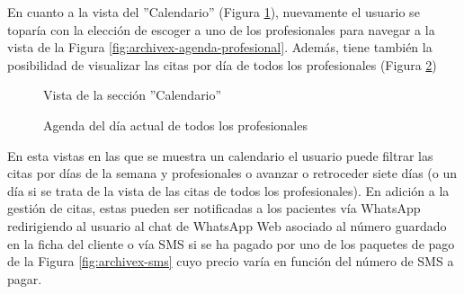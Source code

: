 En cuanto a la vista del ''Calendario'' (Figura \ref{fig:archivex-calendario}), nuevamente el usuario se toparía con la elección de escoger a uno de los profesionales para navegar a la vista de la Figura \ref{fig:archivex-agenda-profesional}. Además, tiene también la posibilidad de visualizar las citas por día de todos los profesionales (Figura \ref{fig:archivex-agenda-todos})

\begin{figure}[H]
    \caption{Vista de la sección ''Calendario''}
    \label{fig:archivex-calendario}
\end{figure}

\begin{figure}[H]
    \caption{Agenda del día actual de todos los profesionales}
    \label{fig:archivex-agenda-todos}
\end{figure}

En esta vistas en las que se muestra un calendario el usuario puede filtrar las citas por días de la semana y profesionales o avanzar o retroceder siete días (o un día si se trata de la vista de las citas de todos los profesionales). En adición a la gestión de citas, estas pueden ser notificadas a los pacientes vía WhatsApp redirigiendo al usuario al chat de WhatsApp Web asociado al número guardado en la ficha del cliente o vía SMS si se ha pagado por uno de los paquetes de pago de la Figura \ref{fig:archivex-sms} cuyo precio varía en función del número de SMS a pagar. \bigskip

